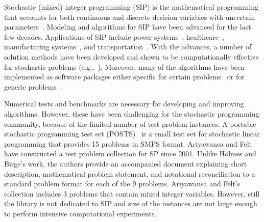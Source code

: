 Stochastic (mixed) integer programming (SIP) is the mathematical programming that accounts for 
both continuous and discrete decision variables with uncertain parameters~\cite{book:BL2011}. 
Modeling and algorithms for SIP have been advanced for the last few decades. Applications of SIP include power systems~\cite{?}, healthcare~\cite{?}, manufacturing systems~\cite{?}, and transportation~\cite{?}. With the advances, a number of solution methods have been developed and shown to be computationally effective for stochastic problems (e.g.,~\cite{?}). Moreover, many of the algorithms have been implemented as software packages either specific for certain problems~\cite{?} or for generic problems~\cite{?}.

Numerical tests and benchmarks are necessary for developing and improving algorithms. However,
these have been challenging for the stochastic programming community, because of the limited number of test problem instances. 
A portable stochastic programming test set (POSTS)~\cite{POSTS} is a small test set for 
stochastic linear programming that provides 15 problems in SMPS format. 
Ariyawansa and Felt~\cite{journal:AF2004} have constructed a test problem collection for SP 
since 2001. Unlike Holmes and Birge's work, the authors provide an accompanied document 
explaining short description, mathematical problem statement, and notational reconciliation 
to a standard problem format for each of the 9 problems. Ariyawansa and Felt's collection 
includes 3 problems that contain mixed integer variables. However, still the library is not 
dedicated to SIP and size of the instances are not large enough to perform intensive 
computational experiments. 

